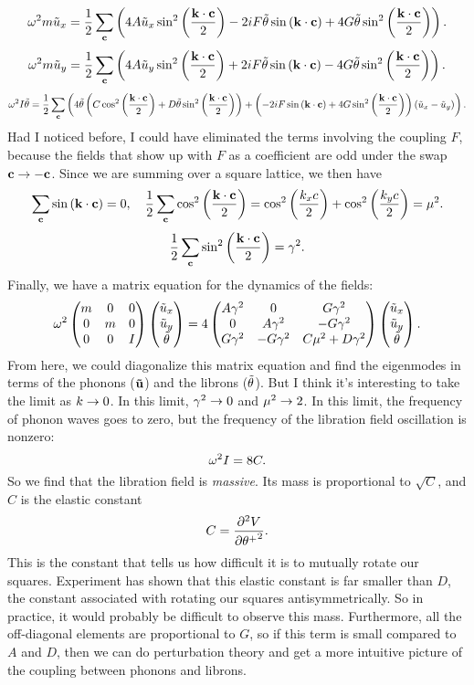 \documentclass[12pt]{article}
\begin{document}
\[ \omega^2 m \tilde u_x = \frac{1}{2}\sum_{\mathbf{c}} \left( 4A\tilde u_x \sin^2\left(\frac{\mathbf{k}\cdot\mathbf{c}}{2}\right) - 2iF\tilde {\theta} \sin{\left(\ensuremath{\mathbf{k}\cdot\mathbf{c}}\right)} + 4G\tilde {\theta} \sin^2\left(\frac{\mathbf{k}\cdot\mathbf{c}}{2}\right)\right).\]
\[ \omega^2 m \tilde u_y = \frac{1}{2}\sum_{\mathbf{c}} \left( 4A\tilde u_y \sin^2\left(\frac{\mathbf{k}\cdot\mathbf{c}}{2}\right) + 2iF\tilde {\theta} \sin{\left(\ensuremath{\mathbf{k}\cdot\mathbf{c}}\right)} - 4G\tilde {\theta} \sin^2\left(\frac{\mathbf{k}\cdot\mathbf{c}}{2}\right)\right).\]
\[ \omega^2 I \tilde {\theta} = \frac{1}{2}\sum_{\mathbf{c}} \left( 4 \tilde {\theta}\left(C \cos^2\left(\frac{\mathbf{k}\cdot\mathbf{c}}{2}\right) + D \tilde {\theta} \sin^2\left(\frac{\mathbf{k}\cdot\mathbf{c}}{2}\right)\right) + \left(-2i F\sin{\left(\ensuremath{\mathbf{k}\cdot\mathbf{c}}\right)} + 4G \sin^2\left(\frac{\mathbf{k}\cdot\mathbf{c}}{2}\right)\right)\left(\tilde u_x - \tilde u_y\right) \right).\]
Had I noticed before, I could have eliminated the terms involving the coupling $F$, because the fields that show up with $F$ as a coefficient are odd under the swap $\mathbf{c}\rightarrow- \mathbf{c}$. Since we are summing over a square lattice, we then have
\[ \sum_{\mathbf{c}} \sin{\left(\ensuremath{\mathbf{k}\cdot\mathbf{c}}\right)} = 0,\quad \frac{1}{2}\sum_{\mathbf{c}} \cos^2\left(\frac{\mathbf{k}\cdot\mathbf{c}}{2}\right) = \cos^2\left(\frac{k_x c}{2}\right) + \cos^2\left(\frac{k_y c}{2}\right) = \mu^2.\]
\[ \frac{1}{2}\sum_{\mathbf{c}} \sin^2\left(\frac{\mathbf{k}\cdot\mathbf{c}}{2}\right) = \gamma^2.\]
Finally, we have a matrix equation for the dynamics of the fields:
\[ \omega^2\left(\begin{matrix}m & 0 & 0 \\ 0 & m & 0 \\ 0 & 0 & I\end{matrix}\right)\left(\begin{matrix}\tilde u_x \\\tilde  u_y \\\tilde {\theta}\end{matrix}\right) = 4\left(\begin{matrix}A\gamma^2 & 0 & G\gamma^2 \\ 0 & A\gamma^2 & -G\gamma^2 \\ G \gamma^2 & - G\gamma^2 & C\mu^2 + D\gamma^2\end{matrix}\right)\left(\begin{matrix}\tilde u_x \\ \tilde u_y \\ \tilde {\theta}\end{matrix}\right).\]
From here, we could diagonalize this matrix equation and find the eigenmodes in terms of the phonons ($\mathbf{\tilde u}$) and the librons ($\tilde {\theta}$). But I think it's interesting to take the limit as $k\rightarrow 0$. In this limit, $\gamma^2\rightarrow 0$ and $\mu^2 \rightarrow 2$. In this limit, the frequency of phonon waves goes to zero, but the frequency of the libration field oscillation is nonzero:
\[ \omega^2 I = 8C.\]
So we find that the libration field is \emph{massive}. Its mass is proportional to $\sqrt{C}$, and $C$ is the elastic constant
\[ C = \frac{\partial^2 {V}}{\partial {\theta^+}^2}.\]
This is the constant that tells us how difficult it is to mutually rotate our squares. Experiment has shown that this elastic constant is far smaller than $D$, the constant associated with rotating our squares antisymmetrically. So in practice, it would probably be difficult to observe this mass. Furthermore, all the off-diagonal elements are proportional to $G$, so if this term is small compared to $A$ and $D$, then we can do perturbation theory and get a more intuitive picture of the coupling between phonons and librons.
\end{document}
